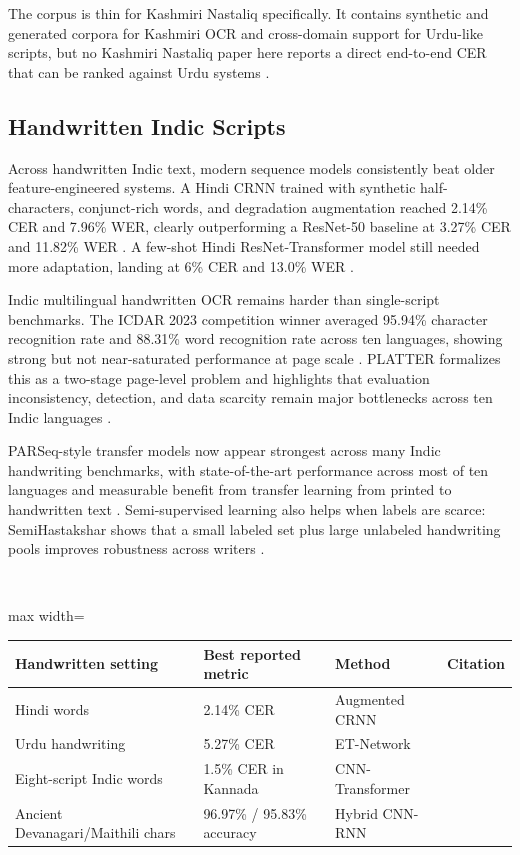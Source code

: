    
    The corpus is thin for Kashmiri Nastaliq specifically. It contains synthetic and generated corpora for Kashmiri OCR and cross-domain support for Urdu-like scripts, but no Kashmiri Nastaliq paper here reports a direct end-to-end CER that can be ranked against Urdu systems  \cite{Nasir2021MMU-OCR-21:} \cite{Akoushideh2025Persian/Arabic} \cite{Rizvi2020Deep}.
    
    
    \subsection*{Handwritten Indic Scripts}
    
    
    Across handwritten Indic text, modern sequence models consistently beat older feature-engineered systems. A Hindi CRNN trained with synthetic half-characters, conjunct-rich words, and degradation augmentation reached 2.14\% CER and 7.96\% WER, clearly outperforming a ResNet-50 baseline at 3.27\% CER and 11.82\% WER  \cite{Kumar2026Enhancing}. A few-shot Hindi ResNet-Transformer model still needed more adaptation, landing at 6\% CER and 13.0\% WER  \cite{Equbal2025Few-Shot}.
    
    
    Indic multilingual handwritten OCR remains harder than single-script benchmarks. The ICDAR 2023 competition winner averaged 95.94\% character recognition rate and 88.31\% word recognition rate across ten languages, showing strong but not near-saturated performance at page scale  \cite{Mondal2023ICDAR}. PLATTER formalizes this as a two-stage page-level problem and highlights that evaluation inconsistency, detection, and data scarcity remain major bottlenecks across ten Indic languages  \cite{Kasuba2025PLATTER:}.
    
    
    PARSeq-style transfer models now appear strongest across many Indic handwriting benchmarks, with state-of-the-art performance across most of ten languages and measurable benefit from transfer learning from printed to handwritten text  \cite{Lalitha2025Enhancing}. Semi-supervised learning also helps when labels are scarce: SemiHastakshar shows that a small labeled set plus large unlabeled handwriting pools improves robustness across writers  \cite{Evani2025SemiHastakshar:}.
    
    
    \mbox{}\\
    \begin{adjustbox}{max width=\textwidth}
    \begin{tabular}{p{4.0cm} | p{4.0cm} | p{4.0cm} | p{4.0cm}}
    \hline
    Handwritten setting & Best reported metric & Method & Citation \\
    \hline
    Hindi words & 2.14\% CER & Augmented CRNN & \cite{Kumar2026Enhancing} \\
    Urdu handwriting & 5.27\% CER & ET-Network & \cite{Hamza2024ET-Network:} \\
    Eight-script Indic words & 1.5\% CER in Kannada & CNN-Transformer & \cite{Gupta2023Handwritten} \\
    Ancient Devanagari/Maithili chars & 96.97\% / 95.83\% accuracy & Hybrid CNN-RNN & \cite{Jindal2023A} \\
    \hline
    \end{tabular}
    \end{adjustbox}
    

